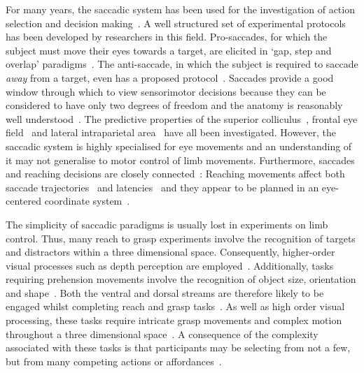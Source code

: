 \documentclass[10pt,letterpaper]{article}
\begin{document}
%
%
%

For many years, the saccadic system has been used for the
investigation of action selection and decision
making~\cite{deubel_saccade_1996,mcpeek_saccade_2002,carpenter_contrast_2004,rorie_integration_2010,bompas_saccadic_2011,reppert_modulation_2015}. A
well structured set of experimental protocols has been developed by
researchers in this field. Pro-saccades, for which the subject must
move their eyes towards a target, are elicited in `gap, step and
overlap' paradigms~\cite{saslow_effects_1967}. The anti-saccade, in
which the subject is required to saccade \emph{away} from a target,
even has a proposed
protocol~\cite{antoniades_internationally_2013}. Saccades provide a
good window through which to view sensorimotor decisions because they
can be considered to have only two degrees of freedom and the anatomy
is reasonably well
understood~\cite{moschovakis_anatomy_1994,moschovakis_microscopic_1996,sparks_brainstem_2002}.
The predictive properties of the superior
colliculus~\cite{ratcliff_comparison_2003}, frontal eye
field~\cite{schall_neural_1993} and lateral intraparietal
area~\cite{hanks_microstimulation_2006,rorie_integration_2010} have
all been investigated.  However, the saccadic system is highly
specialised for eye movements and an understanding of it may not
generalise to motor control of limb movements. Furthermore, saccades
and reaching decisions are closely
connected~\cite{gribble_hand-eye_2002}: Reaching movements affect both
saccade trajectories~\cite{tipper_reaching_2001} and
latencies~\cite{fisk_organization_1985,neggers_ocular_2000} and they
appear to be planned in an eye-centered coordinate
system~\cite{batista_reach_1999}.

The simplicity of saccadic paradigms is usually lost in experiments on
limb control. Thus, many reach to grasp experiments involve the
recognition of targets and distractors within a three dimensional
space. Consequently, higher-order visual processes such as depth
perception are employed~\cite{welsh_movement_2004}. Additionally,
tasks requiring prehension movements involve the recognition of object
size, orientation and shape~\cite{meegan_visual_1999}. Both the
ventral and dorsal streams are therefore likely to be engaged whilst
completing reach and grasp tasks~\cite{milner_two_2008}. As well as
high order visual processing, these tasks require intricate grasp
movements and complex motion throughout a three dimensional
space~\cite{howard_hand_1997,tipper_selective_1997,
  tipper_actionbased_1998,castiello_mechanisms_1999,jackson_are_1995}. A
consequence of the complexity associated with these tasks is that
participants may be selecting from not a few, but from many competing
actions or affordances~\cite{cisek_cortical_2007}.
\end{document}
